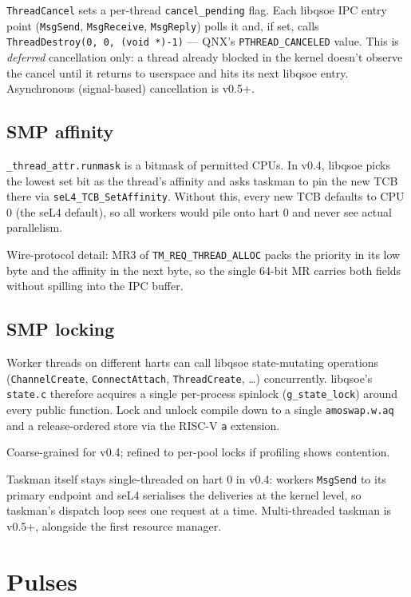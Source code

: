 \texttt{ThreadCancel} sets a per-thread \texttt{cancel\_pending} flag.
Each libqsoe IPC entry point (\texttt{MsgSend}, \texttt{MsgReceive},
\texttt{MsgReply}) polls it and, if set, calls
\texttt{ThreadDestroy(0, 0, (void *)-1)} --- QNX's
\texttt{PTHREAD\_CANCELED} value.  This is \emph{deferred}
cancellation only: a thread already blocked in the kernel doesn't
observe the cancel until it returns to userspace and hits its next
libqsoe entry.  Asynchronous (signal-based) cancellation is v0.5+.

\subsection{SMP affinity}

\texttt{\_thread\_attr.runmask} is a bitmask of permitted CPUs.  In
v0.4, libqsoe picks the lowest set bit as the thread's affinity and
asks taskman to pin the new TCB there via
\texttt{seL4\_TCB\_SetAffinity}.  Without this, every new TCB defaults
to CPU 0 (the seL4 default), so all workers would pile onto hart 0
and never see actual parallelism.

Wire-protocol detail: MR3 of \texttt{TM\_REQ\_THREAD\_ALLOC} packs the
priority in its low byte and the affinity in the next byte, so the
single 64-bit MR carries both fields without spilling into the IPC
buffer.

\subsection{SMP locking}

Worker threads on different harts can call libqsoe state-mutating
operations (\texttt{ChannelCreate}, \texttt{ConnectAttach},
\texttt{ThreadCreate}, \ldots) concurrently.  libqsoe's
\texttt{state.c} therefore acquires a single per-process spinlock
(\texttt{g\_state\_lock}) around every public function.  Lock and
unlock compile down to a single \texttt{amoswap.w.aq} and a
release-ordered store via the RISC-V \texttt{a} extension.

Coarse-grained for v0.4; refined to per-pool locks if profiling shows
contention.

Taskman itself stays single-threaded on hart 0 in v0.4: workers
\texttt{MsgSend} to its primary endpoint and seL4 serialises the
deliveries at the kernel level, so taskman's dispatch loop sees one
request at a time.  Multi-threaded taskman is v0.5+, alongside the
first resource manager.

\section{Pulses}
\label{sec:pulses}

